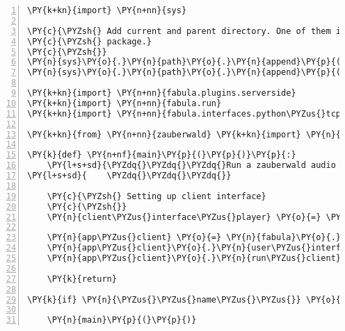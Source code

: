 \begin{Verbatim}[commandchars=\\\{\},numbers=left,firstnumber=1,stepnumber=1]
\PY{k+kn}{import} \PY{n+nn}{sys}

\PY{c}{\PYZsh{} Add current and parent directory. One of them is supposed to contain the fabula}
\PY{c}{\PYZsh{} package.}
\PY{c}{\PYZsh{}}
\PY{n}{sys}\PY{o}{.}\PY{n}{path}\PY{o}{.}\PY{n}{append}\PY{p}{(}\PY{l+s}{\PYZdq{}}\PY{l+s}{../}\PY{l+s}{\PYZdq{}}\PY{p}{)}
\PY{n}{sys}\PY{o}{.}\PY{n}{path}\PY{o}{.}\PY{n}{append}\PY{p}{(}\PY{l+s}{\PYZdq{}}\PY{l+s}{./}\PY{l+s}{\PYZdq{}}\PY{p}{)}

\PY{k+kn}{import} \PY{n+nn}{fabula.plugins.serverside}
\PY{k+kn}{import} \PY{n+nn}{fabula.run}
\PY{k+kn}{import} \PY{n+nn}{fabula.interfaces.python\PYZus{}tcp}

\PY{k+kn}{from} \PY{n+nn}{zauberwald} \PY{k+kn}{import} \PY{n}{ZWAudioUI}

\PY{k}{def} \PY{n+nf}{main}\PY{p}{(}\PY{p}{)}\PY{p}{:}
    \PY{l+s+sd}{\PYZdq{}\PYZdq{}\PYZdq{}Run a zauberwald audio client.}
\PY{l+s+sd}{    \PYZdq{}\PYZdq{}\PYZdq{}}

    \PY{c}{\PYZsh{} Setting up client interface}
    \PY{c}{\PYZsh{}}
    \PY{n}{client\PYZus{}interface\PYZus{}player} \PY{o}{=} \PY{n}{fabula}\PY{o}{.}\PY{n}{interfaces}\PY{o}{.}\PY{n}{python\PYZus{}tcp}\PY{o}{.}\PY{n}{TCPClientInterface}\PY{p}{(}\PY{p}{)}

    \PY{n}{app\PYZus{}client} \PY{o}{=} \PY{n}{fabula}\PY{o}{.}\PY{n}{run}\PY{o}{.}\PY{n}{App}\PY{p}{(}\PY{n}{timeout}\PY{o}{=}\PY{l+m+mi}{0}\PY{p}{)}
    \PY{n}{app\PYZus{}client}\PY{o}{.}\PY{n}{user\PYZus{}interface\PYZus{}class} \PY{o}{=} \PY{n}{ZWAudioUI}
    \PY{n}{app\PYZus{}client}\PY{o}{.}\PY{n}{run\PYZus{}client}\PY{p}{(}\PY{l+m+mi}{30}\PY{p}{,} \PY{n}{client\PYZus{}interface\PYZus{}player}\PY{p}{)}

    \PY{k}{return}

\PY{k}{if} \PY{n}{\PYZus{}\PYZus{}name\PYZus{}\PYZus{}} \PY{o}{==} \PY{l+s}{\PYZdq{}}\PY{l+s}{\PYZus{}\PYZus{}main\PYZus{}\PYZus{}}\PY{l+s}{\PYZdq{}}\PY{p}{:}

    \PY{n}{main}\PY{p}{(}\PY{p}{)}
\end{Verbatim}
